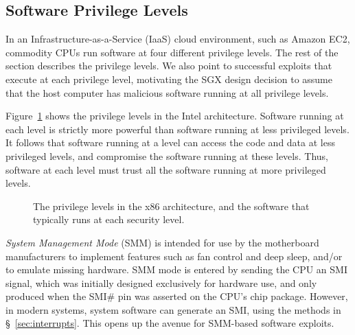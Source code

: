 \subsection{Software Privilege Levels}
\label{sec:rings}

In an Infrastructure-as-a-Service (IaaS) cloud environment, such as Amazon EC2,
commodity CPUs run software at four different privilege levels. The rest of the
section describes the privilege levels. We also point to successful exploits
that execute at each privilege level, motivating the SGX design decision to
assume that the host computer has malicious software running at all privilege
levels.

Figure~\ref{fig:cpu_rings} shows the privilege levels in the Intel
architecture. Software running at each level is strictly more powerful than
software running at less privileged levels. It follows that software running at
a level can access the code and data at less privileged levels, and compromise
the software running at these levels. Thus, software at each level must trust
all the software running at more privileged levels.

\begin{figure}[hbtp]
  \caption{
    The privilege levels in the x86 architecture, and the software that
    typically runs at each security level.
  }
  \label{fig:cpu_rings}
\end{figure}


\textit{System Management Mode} (SMM) is intended for use by the motherboard
manufacturers to implement features such as fan control and deep sleep, and/or
to emulate missing hardware. SMM mode is entered by sending the CPU an SMI
signal, which was initially designed exclusively for hardware use, and only
produced when the SMI\# pin was asserted on the CPU's chip package. However, in
modern systems, system software can generate an SMI, using the methods in
\S~\ref{sec:interrupts}. This opens up the avenue for SMM-based software
exploits.

